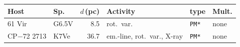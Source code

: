 \begin{tabular}{@{}l@{~}l@{~}r@{~}p{1.25cm}@{~}l@{~}l@{}}
\hline
Host & Sp. & $d$\,(pc) & Activity & type & Mult. \\
\hline
61 Vir & G6.5V & 8.5 & rot.\ var. & \texttt{PM*} & none \\
CP$-$72 2713 & K7Ve & 36.7 & em.-line, rot.\ var., X-ray & \texttt{PM*} & none \\
\hline
\end{tabular}
